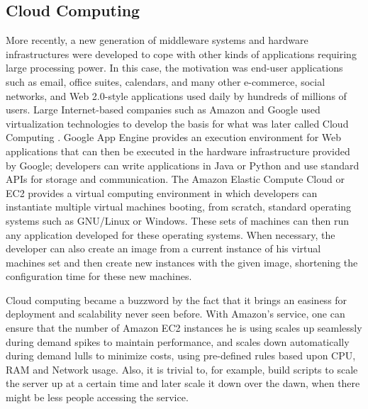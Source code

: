 \subsection{Cloud Computing}
More recently, a new generation of middleware systems and hardware infrastructures were developed to cope with other kinds of applications requiring large processing power. In this case, the motivation was end-user applications such as email, office suites, calendars, and many other e-commerce, social networks, and Web 2.0-style applications used daily by hundreds of millions of users. Large Internet-based companies such as Amazon and Google used virtualization technologies to develop the basis for what was later called Cloud Computing \citep{ZCB10}. Google App Engine provides an execution environment for Web applications that can then be executed in the hardware infrastructure provided by Google; developers can write applications in Java or Python and use standard APIs for storage and communication.  The Amazon Elastic Compute Cloud or EC2 \citep{EC2} provides a virtual computing environment in which developers can instantiate multiple virtual machines booting, from scratch, standard operating systems such as GNU/Linux or Windows. These sets of machines can then run any application developed for these operating systems. When necessary, the developer can also create an image from a current instance of his virtual machines set and then create new instances with the given image, shortening the configuration time for these new machines.

Cloud computing became a buzzword by the fact that it brings an easiness for deployment and scalability never seen before. With Amazon's service, one can ensure that the number of Amazon EC2 instances he is using scales up seamlessly during demand spikes to maintain performance, and scales down automatically during demand lulls to minimize costs, using pre-defined rules based upon CPU, RAM and Network usage. Also, it is trivial to, for example, build scripts to scale the server up at a certain time and later scale it down over the dawn, when there might be less people accessing the service.

